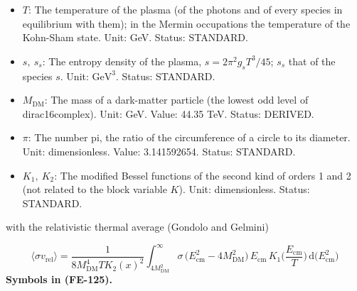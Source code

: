 \documentclass[
  10pt,
]{article}
\begin{document}
\begin{itemize}
\item
  \(T\): The temperature of the plasma (of the photons and of every
  species in equilibrium with them); in the Mermin occupations the
  temperature of the Kohn-Sham state. Unit: GeV. Status: STANDARD.
\item
  \(s,\ s_s\): The entropy density of the plasma,
  \(s = 2\pi^2g_sT^3/45\); \(s_s\) that of the species \(s\). Unit:
  \(\mathrm{GeV}^{3}\). Status: STANDARD.
\item
  \(M_{\mathrm{DM}}\): The mass of a dark-matter particle (the lowest
  odd level of dirac16complex). Unit: GeV. Value: 44.35 TeV. Status:
  DERIVED.
\item
  \(\pi\): The number pi, the ratio of the circumference of a circle to
  its diameter. Unit: dimensionless. Value: 3.141592654. Status:
  STANDARD.
\item
  \(K_1,\ K_2\): The modified Bessel functions of the second kind of
  orders 1 and 2 (not related to the block variable \(K\)). Unit:
  dimensionless. Status: STANDARD.
\end{itemize}

with the relativistic thermal average (Gondolo and Gelmini)

\[
\langle\sigma v_{\mathrm{rel}}\rangle =
 \frac{1}{8M_{\mathrm{DM}}^4TK_2(x)^2}\int_{4M_{\mathrm{DM}}^2}^{\infty}\sigma\,
 \big(E_{\mathrm{cm}}^2 - 4M_{\mathrm{DM}}^2\big)\,E_{\mathrm{cm}}\,K_1\Big(\frac{E_{\mathrm{cm}}}{T}\Big)\,
 \mathrm{d}\big(E_{\mathrm{cm}}^2\big) \tag{FE-125}
\] \textbf{Symbols in (FE-125).}
\end{document}
